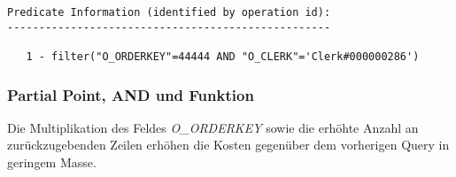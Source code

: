 \documentclass[11pt,a4paper,parskip=half]{scrartcl}
\begin{document}
\begin{lstlisting}
Predicate Information (identified by operation id):                                                                                                                                                                                                                                                          
---------------------------------------------------                                                                                                                                                                                                                                                          
                                                                                                                                                                                                                                                                                                             
   1 - filter("O_ORDERKEY"=44444 AND "O_CLERK"='Clerk#000000286')   
\end{lstlisting}

\subsubsection{Partial Point, AND und Funktion}
\label{no-idx-sel-partial-and-function}
Die Multiplikation des Feldes \emph{O\_ORDERKEY} sowie die erhöhte Anzahl an zurückzugebenden Zeilen erhöhen die Kosten gegenüber dem vorherigen Query in geringem Masse.
\end{document}
